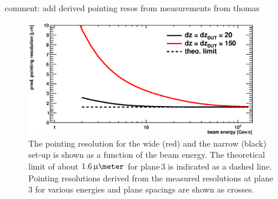 comment: add derived pointing resos from measurements from thomas
\begin{figure}[tbp]
  \centering
  \includegraphics[width=0.9\textwidth]{figures/CalcResoVsP_1600800}
  \caption[Pointing resolution as a function of the beam energy]{
  The pointing resolution for the wide (red) and the narrow (black) set-up is shown as a function of the beam energy.
  The theoretical limit of about $1.6\,\upmu\meter$ for plane\,3 is indicated as a dashed line.
  Pointing resolutions derived from the measured resolutions at plane 3 for various energies and plane spacings are shown as crosses.}
\label{fig:CalcResos}
\end{figure}